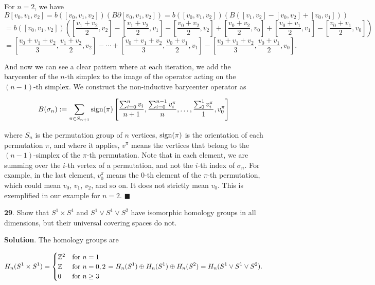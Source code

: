 \documentclass{article}
\newcommand{\Z}{\mathbb{Z}}
\begin{document}
For $n = 2$, we have
$$B[v_{0}, v_{1}, v_{2}] = b([v_{0}, v_{1}, v_{2}])(B\partial [v_{0}, v_{1}, v_{2}]) = b([v_{0}, v_{1}, v_{2}])(B([v_{1}, v_{2}]-[v_{0}, v_{2}] + [v_{0}, v_{1}]))$$
$$= b([v_{0}, v_{1}, v_{2}])\left(\left[\frac{v_{1}+v_{2}}{2}, v_{2}\right] - \left[\frac{v_{1}+v_{2}}{2}, v_{1}\right] - \left[\frac{v_{0}+v_{2}}{2}, v_{2}\right] + \left[\frac{v_{0}+v_{2}}{2}, v_{0}\right] + \left[\frac{v_{0}+v_{1}}{2}, v_{1}\right] - \left[\frac{v_{0}+v_{1}}{2}, v_{0}\right]\right)$$
$$= \left[\frac{v_{0}+v_{1}+v_{2}}{3},\frac{v_{1}+v_{2}}{2}, v_{2}\right] - \cdots + \left[\frac{v_{0}+v_{1}+v_{2}}{3}, \frac{v_{0}+v_{1}}{2}, v_{1}\right] - \left[\frac{v_{0}+v_{1}+v_{2}}{3}, \frac{v_{0}+v_{1}}{2}, v_{0}\right].$$

And now we can see a clear pattern where at each iteration, we add the barycenter of the $n$-th simplex to the image of the operator acting on the $(n-1)$-th simplex. We construct the non-inductive barycenter operator as 

$$B(\sigma_{n}) := \sum_{\pi \in S_{n+1}} \textnormal{sign}(\pi) \left[\frac{\sum_{i=0}^{n} v_{i}}{n+1}, \frac{\sum_{i=0}^{n-1} v^{\pi}_{i}}{n}, \ldots, \frac{\sum_{0}^{1} v^{\pi}_{i}}{1}, v^{\pi}_{0}\right]$$

where $S_{n}$ is the permutation group of $n$ vertices, $\textnormal{sign}(\pi)$ is the orientation of each permutation $\pi$, and where it applies, $v^{\pi}$ means the vertices that belong to the $(n-1)$-simplex of the $\pi$-th permutation. Note that in each element, we are summing over the $i$-th vertex of a permutation, and not the $i$-th index of $\sigma_{n}$. For example, in the last element, $v^{\pi}_{0}$ means the 0-th element of the $\pi$-th permutation, which could mean $v_{0}$, $v_{1}$, $v_{2}$, and so on. It does not strictly mean $v_{0}$. This is exemplified in our example for $n = 2$. $\blacksquare$
\bigskip
\bigskip

\textbf{29}. Show that $S^{1}\times S^{1}$ and $S^{1}\vee S^{1}\vee S^{2}$ have isomorphic homology groups in all dimensions, but their universal covering spaces do not.
\medskip

\textbf{Solution}. The homology groups are

\[H_{n}(S^{1}\times S^{1}) = \begin{cases} \Z^{2} & \textnormal{for } n=1\\ \Z & \textnormal{for } n = 0, 2\\
0 & \textnormal{for } n\geq3 \end{cases} = H_{n}(S^{1})\oplus H_{n}(S^{1})\oplus H_{n}(S^{2}) = H_{n}(S^{1}\vee S^{1}\vee S^{2}).\]
\end{document}
